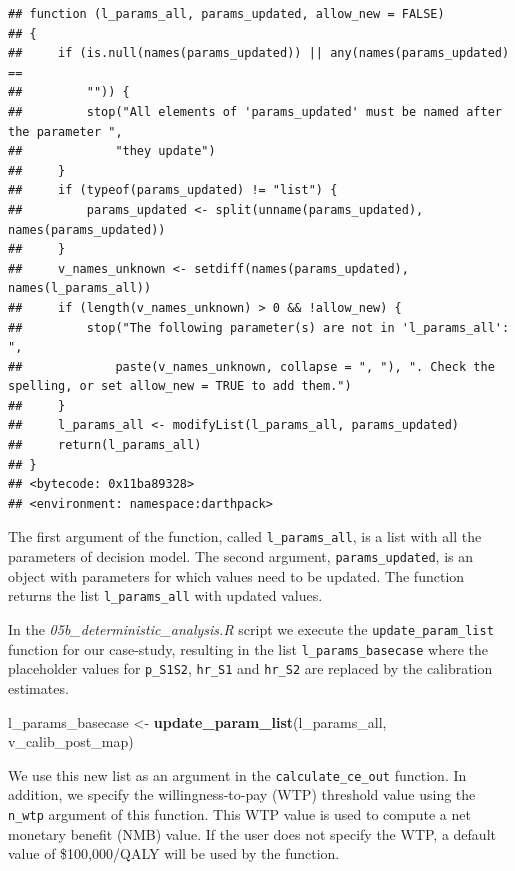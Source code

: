 \documentclass[
]{book}
\newenvironment{Shaded}{\begin{snugshade}}{\end{snugshade}}
\newcommand{\FunctionTok}[1]{\textcolor[rgb]{0.13,0.29,0.53}{\textbf{#1}}}
\newcommand{\NormalTok}[1]{#1}
\newcommand{\OtherTok}[1]{\textcolor[rgb]{0.56,0.35,0.01}{#1}}
\begin{document}
\begin{verbatim}
## function (l_params_all, params_updated, allow_new = FALSE) 
## {
##     if (is.null(names(params_updated)) || any(names(params_updated) == 
##         "")) {
##         stop("All elements of 'params_updated' must be named after the parameter ", 
##             "they update")
##     }
##     if (typeof(params_updated) != "list") {
##         params_updated <- split(unname(params_updated), names(params_updated))
##     }
##     v_names_unknown <- setdiff(names(params_updated), names(l_params_all))
##     if (length(v_names_unknown) > 0 && !allow_new) {
##         stop("The following parameter(s) are not in 'l_params_all': ", 
##             paste(v_names_unknown, collapse = ", "), ". Check the spelling, or set allow_new = TRUE to add them.")
##     }
##     l_params_all <- modifyList(l_params_all, params_updated)
##     return(l_params_all)
## }
## <bytecode: 0x11ba89328>
## <environment: namespace:darthpack>
\end{verbatim}

The first argument of the function, called \texttt{l\_params\_all}, is a list with all the parameters of decision model. The second argument, \texttt{params\_updated}, is an object with parameters for which values need to be updated. The function returns the list \texttt{l\_params\_all} with updated values.

In the \emph{05b\_deterministic\_analysis.R} script we execute the \texttt{update\_param\_list} function for our case-study, resulting in the list \texttt{l\_params\_basecase} where the placeholder values for \texttt{p\_S1S2}, \texttt{hr\_S1} and \texttt{hr\_S2} are replaced by the calibration estimates.

\begin{Shaded}
\begin{Highlighting}[]
\NormalTok{l\_params\_basecase }\OtherTok{\textless{}{-}} \FunctionTok{update\_param\_list}\NormalTok{(l\_params\_all, v\_calib\_post\_map) }
\end{Highlighting}
\end{Shaded}

We use this new list as an argument in the \texttt{calculate\_ce\_out} function. In addition, we specify the willingness-to-pay (WTP) threshold value using the \texttt{n\_wtp} argument of this function. This WTP value is used to compute a net monetary benefit (NMB) value. If the user does not specify the WTP, a default value of \$100,000/QALY will be used by the function.
\end{document}
